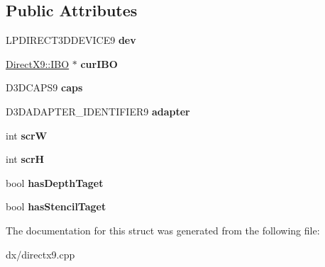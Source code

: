 \subsection*{Public Attributes}
\begin{DoxyCompactItemize}
\item 
\hypertarget{struct_direct_x9_1_1_device_a948080d9d9bd35e4e807e8fa3b03095f}{L\+P\+D\+I\+R\+E\+C\+T3\+D\+D\+E\+V\+I\+C\+E9 {\bfseries dev}}\label{struct_direct_x9_1_1_device_a948080d9d9bd35e4e807e8fa3b03095f}

\item 
\hypertarget{struct_direct_x9_1_1_device_ac3905028bcb8ae99e1298f36be83d347}{\hyperlink{struct_direct_x9_1_1_i_b_o}{Direct\+X9\+::\+I\+B\+O} $\ast$ {\bfseries cur\+I\+B\+O}}\label{struct_direct_x9_1_1_device_ac3905028bcb8ae99e1298f36be83d347}

\item 
\hypertarget{struct_direct_x9_1_1_device_ad98cb6872ca4bf70cfa3876c495e5793}{D3\+D\+C\+A\+P\+S9 {\bfseries caps}}\label{struct_direct_x9_1_1_device_ad98cb6872ca4bf70cfa3876c495e5793}

\item 
\hypertarget{struct_direct_x9_1_1_device_abcc1619c124ab004163f140d5ddd428e}{D3\+D\+A\+D\+A\+P\+T\+E\+R\+\_\+\+I\+D\+E\+N\+T\+I\+F\+I\+E\+R9 {\bfseries adapter}}\label{struct_direct_x9_1_1_device_abcc1619c124ab004163f140d5ddd428e}

\item 
\hypertarget{struct_direct_x9_1_1_device_a06f5d14e83c0ad2dc4fcfee0006a39b1}{int {\bfseries scr\+W}}\label{struct_direct_x9_1_1_device_a06f5d14e83c0ad2dc4fcfee0006a39b1}

\item 
\hypertarget{struct_direct_x9_1_1_device_adecbe2c25d06f174ea09105705573313}{int {\bfseries scr\+H}}\label{struct_direct_x9_1_1_device_adecbe2c25d06f174ea09105705573313}

\item 
\hypertarget{struct_direct_x9_1_1_device_ae1517100fdd460a48476b396d2dce2f5}{bool {\bfseries has\+Depth\+Taget}}\label{struct_direct_x9_1_1_device_ae1517100fdd460a48476b396d2dce2f5}

\item 
\hypertarget{struct_direct_x9_1_1_device_a1fb7506435e8179beec2d44c1bc2014b}{bool {\bfseries has\+Stencil\+Taget}}\label{struct_direct_x9_1_1_device_a1fb7506435e8179beec2d44c1bc2014b}

\end{DoxyCompactItemize}


The documentation for this struct was generated from the following file\+:\begin{DoxyCompactItemize}
\item 
dx/directx9.\+cpp\end{DoxyCompactItemize}
